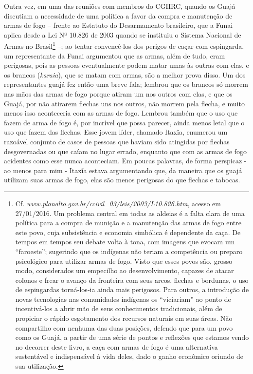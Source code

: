 Outra vez, em uma das reuniões com membros do CGIIRC, quando os Guajá
discutiam a necessidade de uma política a favor da compra e manutenção
de armas de fogo -- frente ao Estatuto do Desarmamento brasileiro, que a
Funai aplica desde a Lei Nº 10.826 de 2003 quando se instituiu o Sistema
Nacional de Armas no Brasil\footnote{Cf. \emph{www.planalto.gov.br/ccivil\_03/leis/2003/L10.826.htm},
  acesso em 27/01/2016. Um problema central em todas as aldeias é a
  falta clara de uma política para a compra de munição e a manutenção
  das armas de fogo entre este povo, cuja subsistência e economia
  simbólica é dependente da caça. De tempos em tempos seu debate volta à
  tona, com imagens que evocam um ``faroeste''; sugerindo que os
  indígenas não teriam a competência ou preparo psicológico para
  utilizar armas de fogo. Visto que esses povos são, grosso modo,
  considerados um empecilho ao desenvolvimento, capazes de atacar
  colonos e frear o avanço da fronteira com seus arcos, flechas e
  bordunas, o uso de espingardas torná-los-ia ainda mais perigosos. Para
  outros, a introdução de novas tecnologias nas comunidades indígenas os
  ``viciariam'' ao ponto de incentivá-los a abrir mão de seus
  conhecimentos tradicionais, além de propiciar o rápido esgotamento dos
  recursos naturais em suas áreas. Não compartilho com nenhuma das duas
  posições, defendo que para um povo como os Guajá, a partir de uma
  série de pontos e reflexões que estamos vendo no decorrer deste livro,
  a caça com armas de fogo é uma alternativa sustentável e indispensável
  à vida deles, dado o ganho econômico oriundo de sua utilização.} --; ao
tentar convencê-los dos perigos de caçar com espingarda, um
representante da Funai argumentou que as armas, além de tudo, eram
perigosas, pois as pessoas eventualmente podem matar umas às outras com
elas, e os brancos (\emph{karaia}), que se matam com armas, são a melhor
prova disso. Um dos representantes guajá fez então uma breve fala;
lembrou que os brancos só morrem nas mãos das armas de fogo porque
atiram um nos outros com elas, e que os Guajá, por não atirarem flechas
uns nos outros, não morrem pela flecha, e muito menos isso aconteceria
com as armas de fogo. Lembrou também que o uso que fazem de arma de fogo
é, por incrível que possa parecer, ainda menos letal que o uso que fazem
das flechas. Esse jovem líder, chamado Itaxĩa, enumerou um razoável
conjunto de casos de pessoas que haviam sido atingidas por flechas
desgovernadas ou que caíam no lugar errado, enquanto que com as armas de
fogo acidentes como esse nunca aconteciam. Em poucas palavras, de forma
perspicaz - ao menos para mim - Itaxĩa estava argumentando que, da
maneira que os guajá utilizam suas armas de fogo, elas são menos
perigosas do que flechas e tabocas.

